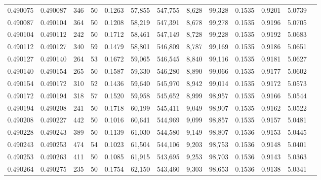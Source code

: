 \begin{tabular}{rrrrrrrrrrrrr}
0.490075 & 0.490087 & 346 &  50 &                                     0.1263 &  57,855 & 547,755 &   8,628 &  99,328 & 0.1535 & 0.9201 & 5.0739 \\
0.490087 & 0.490104 & 364 &  50 &                                     0.1208 &  58,219 & 547,391 &   8,678 &  99,278 & 0.1535 & 0.9196 & 5.0705 \\
0.490104 & 0.490112 & 242 &  50 &                                     0.1712 &  58,461 & 547,149 &   8,728 &  99,228 & 0.1535 & 0.9192 & 5.0683 \\
0.490112 & 0.490127 & 340 &  59 &                                     0.1479 &  58,801 & 546,809 &   8,787 &  99,169 & 0.1535 & 0.9186 & 5.0651 \\
0.490127 & 0.490140 & 264 &  53 &                                     0.1672 &  59,065 & 546,545 &   8,840 &  99,116 & 0.1535 & 0.9181 & 5.0627 \\
0.490140 & 0.490154 & 265 &  50 &                                     0.1587 &  59,330 & 546,280 &   8,890 &  99,066 & 0.1535 & 0.9177 & 5.0602 \\
0.490154 & 0.490172 & 310 &  52 &                                     0.1436 &  59,640 & 545,970 &   8,942 &  99,014 & 0.1535 & 0.9172 & 5.0573 \\
0.490172 & 0.490194 & 318 &  57 &                                     0.1520 &  59,958 & 545,652 &   8,999 &  98,957 & 0.1535 & 0.9166 & 5.0544 \\
0.490194 & 0.490208 & 241 &  50 &                                     0.1718 &  60,199 & 545,411 &   9,049 &  98,907 & 0.1535 & 0.9162 & 5.0522 \\
0.490208 & 0.490227 & 442 &  50 &                                     0.1016 &  60,641 & 544,969 &   9,099 &  98,857 & 0.1535 & 0.9157 & 5.0481 \\
0.490228 & 0.490243 & 389 &  50 &                                     0.1139 &  61,030 & 544,580 &   9,149 &  98,807 & 0.1536 & 0.9153 & 5.0445 \\
0.490243 & 0.490253 & 474 &  54 &                                     0.1023 &  61,504 & 544,106 &   9,203 &  98,753 & 0.1536 & 0.9148 & 5.0401 \\
0.490253 & 0.490263 & 411 &  50 &                                     0.1085 &  61,915 & 543,695 &   9,253 &  98,703 & 0.1536 & 0.9143 & 5.0363 \\
0.490264 & 0.490275 & 235 &  50 &                                     0.1754 &  62,150 & 543,460 &   9,303 &  98,653 & 0.1536 & 0.9138 & 5.0341 \\

\end{tabular}
